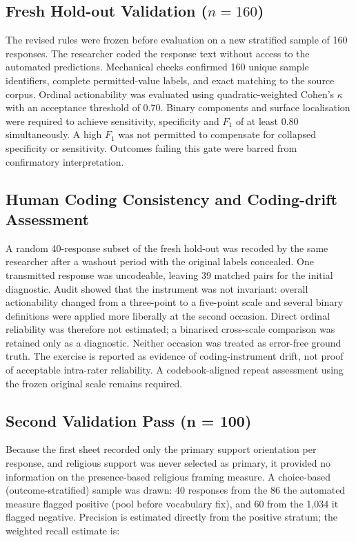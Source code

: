 \subsection{Fresh Hold-out Validation ($n=160$)}

The revised rules were frozen before evaluation on a new stratified sample of 160 responses. The researcher coded the response text without access to the automated predictions. Mechanical checks confirmed 160 unique sample identifiers, complete permitted-value labels, and exact matching to the source corpus. Ordinal actionability was evaluated using quadratic-weighted Cohen's $\kappa$ with an acceptance threshold of 0.70. Binary components and surface localisation were required to achieve sensitivity, specificity and $F_1$ of at least 0.80 simultaneously. A high $F_1$ was not permitted to compensate for collapsed specificity or sensitivity. Outcomes failing this gate were barred from confirmatory interpretation.

\subsection{Human Coding Consistency and Coding-drift Assessment}

A random 40-response subset of the fresh hold-out was recoded by the same researcher after a washout period with the original labels concealed. One transmitted response was uncodeable, leaving 39 matched pairs for the initial diagnostic. Audit showed that the instrument was not invariant: overall actionability changed from a three-point to a five-point scale and several binary definitions were applied more liberally at the second occasion. Direct ordinal reliability was therefore not estimated; a binarised cross-scale comparison was retained only as a diagnostic. Neither occasion was treated as error-free ground truth. The exercise is reported as evidence of coding-instrument drift, not proof of acceptable intra-rater reliability. A codebook-aligned repeat assessment using the frozen original scale remains required.

\subsection{Second Validation Pass (n = 100)}

Because the first sheet recorded only the primary support orientation per response, and religious support was never selected as primary, it provided no information on the presence-based religious framing measure. A choice-based (outcome-stratified) sample was drawn: 40 responses from the 86 the automated measure flagged positive (pool before vocabulary fix), and 60 from the 1,034 it flagged negative. Precision is estimated directly from the positive stratum; the weighted recall estimate is:

